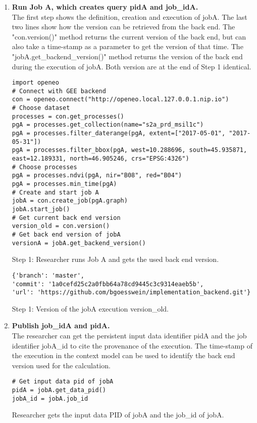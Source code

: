 \documentclass[draft,final]{vutinfth} %
\newenvironment{code}{\captionsetup{type=listing}}{}
\begin{document}
\begin{enumerate}
	\item \textbf{Run Job A, which creates query pidA and job\_idA.} \\
	The first step shows the definition, creation and execution of jobA. The last two lines show how the version can be retrieved from the back end. The "con.version()" method returns the current version of the back end, but can also take a time-stamp as a parameter to get the version of that time. The "jobA.get\_backend\_version()" method returns the version of the back end during the execution of jobA. Both version are at the end of Step 1 identical. 
	\begin{code}
		\begin{verbatim}
import openeo
# Connect with GEE backend
con = openeo.connect("http://openeo.local.127.0.0.1.nip.io")
# Choose dataset
processes = con.get_processes()
pgA = processes.get_collection(name="s2a_prd_msil1c")
pgA = processes.filter_daterange(pgA, extent=["2017-05-01", "2017-05-31"])
pgA = processes.filter_bbox(pgA, west=10.288696, south=45.935871, east=12.189331, north=46.905246, crs="EPSG:4326")
# Choose processes
pgA = processes.ndvi(pgA, nir="B08", red="B04")
pgA = processes.min_time(pgA)
# Create and start job A
jobA = con.create_job(pgA.graph)
jobA.start_job()
# Get current back end version
version_old = con.version()
# Get back end version of jobA 
versionA = jobA.get_backend_version()
		\end{verbatim}
		\caption{Step 1: Researcher runs Job A and gets the used back end version.}
		\label{lst:eva_jobcapture_1}
	\end{code}

	\begin{code}
	\begin{verbatim}
{'branch': 'master',
'commit': '1a0cefd25c2a0fbb64a78cd9445c3c9314eaeb5b',
'url': 'https://github.com/bgoesswein/implementation_backend.git'}
	\end{verbatim}
	\caption{Step 1: Version of the jobA execution version\_old.}
	\label{lst:eva_jobcapture_1_1}
\end{code} 

	\item \textbf{Publish job\_idA and pidA.} \\
	The researcher can get the persistent input data identifier pidA and the job identifier jobA\_id to cite the provenance of the execution. The time-stamp of the execution in the context model can be used to identify the back end version used for the calculation.
	\begin{code}
	\begin{verbatim}
# Get input data pid of jobA 
pidA = jobA.get_data_pid()
jobA_id = jobA.job_id
	\end{verbatim}
	\caption{Researcher gets the input data PID of jobA and the job\_id of jobA.}
	\label{lst:eva_jobcapture_2}
	\end{code}


\end{enumerate}
\end{document}
